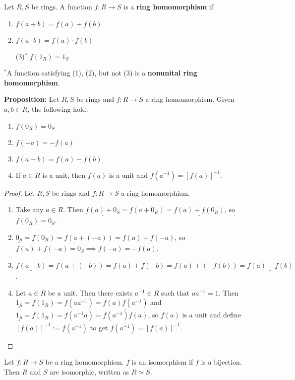 \documentclass [12pt] {article}
\newenvironment{definition}[1]{\begin{tcolorbox}[title={Definition: #1},colback=blue!5!white,colframe=black!75!blue]}{\end{tcolorbox}}
\renewcommand{\bf}[1]{\textbf{{#1}}}
\newcommand{\ul}[1]{\underline{{#1}}}
\begin{document}
\begin{definition}{Homomorphism}
    Let $R, S$ be rings. A function $f : R \to S$ is a \bf{ring homomorphism} if
    \begin{enumerate}[label=(\arabic*)]
        \item $f(a + b) = f(a) + f(b)$
        \item $f(a \cdot b) = f(a) \cdot f(b)$
        \item[(3)$^*$] $f(1_R) = 1_S$
    \end{enumerate}
    $^*$A function satisfying (1), (2), but not (3) is a \bf{nonunital ring homomorphism}.
\end{definition}
\bf{Proposition:} Let $R, S$ be rings and $f : R \to S$ a ring homomorphism. Given $a, b \in R$, the
following hold:
\begin{enumerate}[label=(\arabic*)]
    \item $f(0_R) = 0_S$
    \item $f(-a) = -f(a)$
    \item $f(a - b) = f(a) - f(b)$
    \item If $a \in R$ is a unit, then $f(a)$ is a unit and $f(a^{-1}) = \left[ f(a) \right]^{-1}$.
\end{enumerate}
\begin{proof}
    Let $R, S$ be rings and $f : R \to S$ a ring homomorphism.
    \begin{enumerate}[label=(\arabic*)]
        \item Take any $a \in R$. Then $\ul{f(a) + 0_S} = f(a + 0_R) = \ul{f(a) + f(0_R)}$, so
            $f(0_R) = 0_S$.
        \item $\ul{0_S} = f(0_R) = f(a + (-a)) = \ul{f(a) + f(-a)}$, so 
            $f(a) + f(-a) = 0_S \implies f(-a) = -f(a)$.
        \item $\ul{f(a - b)} = f(a + (-b)) = f(a) + f(-b) = f(a) + (-f(b)) = \ul{f(a) - f(b)}$.
        \item Let $a \in R$ be a unit. Then there exists $a^{-1} \in R$ such that $aa^{-1} = 1$. 
            Then 
            \newline
            $\ul{1_S} = f(1_R) = f(aa^{-1}) = \ul{f(a)f(a^{-1})}$ and
            $\ul{1_S} = f(1_R) = f(a^{-1}a) = \ul{f(a^{-1})f(a)}$, so $f(a)$ is a unit and define 
            $\left[ f(a) \right]^{-1} := f(a^{-1})$ to get $f(a^{-1}) = \left[ f(a) \right]^{-1}$.
    \end{enumerate}
\end{proof}
\begin{definition}{Isomorphism}
    Let $f : R \to S$ be a ring homomorphism. $f$ is an isomorphism if $f$ is a bijection. Then
    $R$ and $S$ are isomorphic, written as $R \simeq S$.
\end{definition}
\end{document}
